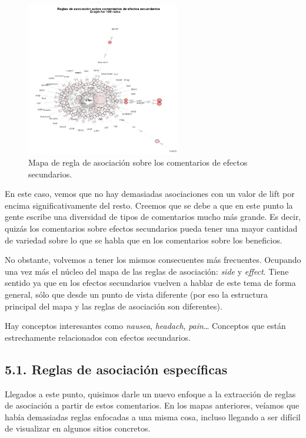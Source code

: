 \documentclass[spanish,]{article}
\begin{document}
\begin{figure}[ht]
    \centering
    \includegraphics[width=0.6\textwidth]{figuras/asociacion/asociacion_efectos.png}
    \caption{Mapa de regla de asociación sobre los comentarios de efectos secundarios.}
    \label{fig:asociacion:effects}
\end{figure}

En este caso, vemos que no hay demasiadas asociaciones con un valor de
lift por encima significativamente del resto. Creemos que se debe a que
en este punto la gente escribe una diversidad de tipos de comentarios
mucho más grande. Es decir, quizás los comentarios sobre efectos
secundarios pueda tener una mayor cantidad de variedad sobre lo que se
habla que en los comentarios sobre los beneficios.

No obstante, volvemos a tener los mismos consecuentes más frecuentes.
Ocupando una vez más el núcleo del mapa de las reglas de asociación:
\emph{side} y \emph{effect}. Tiene sentido ya que en los efectos
secundarios vuelven a hablar de este tema de forma general, sólo que
desde un punto de vista diferente (por eso la estructura principal del
mapa y las reglas de asociación son diferentes).

Hay conceptos interesantes como \emph{nausea}, \emph{headach},
\emph{pain}\ldots{} Conceptos que están estrechamente relacionados con
efectos secundarios.

\subsection{5.1. Reglas de asociación
específicas}\label{reglas-de-asociacion-especificas}

Llegados a este punto, quisimos darle un nuevo enfoque a la extracción
de reglas de asociación a partir de estos comentarios. En los mapas
anteriores, veíamos que había demasiadas reglas enfocadas a una misma
cosa, incluso llegando a ser difícil de visualizar en algunos sitios
concretos.
\end{document}
